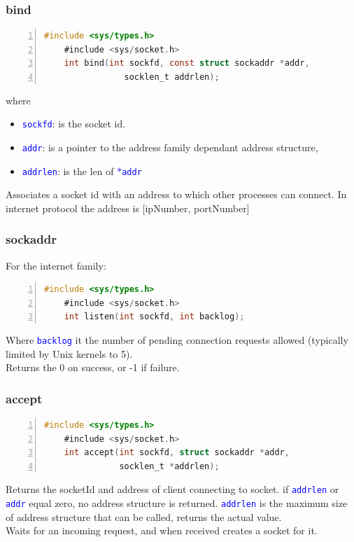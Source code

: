 \documentclass[12pt]{beamer}
\begin{document}
\begin{frame}[fragile]
	\frametitle{bind}
	{\tiny
	\begin{lstlisting}[language=C, breaklines=true, commentstyle=\color{mygreen},frame=lrtb,  rulecolor=\color{black}, numbers=left,  numbersep=5pt, numberstyle=\tiny\color{mygray}]
	#include <sys/types.h>
	#include <sys/socket.h>
	int bind(int sockfd, const struct sockaddr *addr,
                socklen_t addrlen);
	\end{lstlisting}}
	{\footnotesize
	where 
	\begin{itemize}
		\item \texttt{\textcolor{blue}{sockfd}}: is the socket id.
		\item \texttt{\textcolor{blue}{addr}}: is a pointer to the address family dependant address structure,
		\item \texttt{\textcolor{blue}{addrlen}}: is the len of \texttt{\textcolor{blue}{$\ast$addr}}
	\end{itemize}
	Associates a socket id with an address to which other processes can connect. In internet protocol the address is [ipNumber, portNumber]
	}
\end{frame}

\begin{frame}[fragile]
	\frametitle{sockaddr}
	{\footnotesize For the internet family:}
	{\tiny
	\begin{lstlisting}[language=C, breaklines=true, commentstyle=\color{mygreen},frame=lrtb,  rulecolor=\color{black}, numbers=left,  numbersep=5pt, numberstyle=\tiny\color{mygray}]
	#include <sys/types.h> 
	#include <sys/socket.h>
	int listen(int sockfd, int backlog);
	\end{lstlisting}}
	{\footnotesize
	Where \texttt{\textcolor{blue}{backlog}} it the number of pending connection requests allowed (typically limited by Unix kernels to 5). \\ Returns the 0 on success, or -1 if failure.
	}
\end{frame}

\begin{frame}[fragile]
	\frametitle{accept}
	{\tiny
	\begin{lstlisting}[language=C, breaklines=true, commentstyle=\color{mygreen},frame=lrtb,  rulecolor=\color{black}, numbers=left,  numbersep=5pt, numberstyle=\tiny\color{mygray}]
	#include <sys/types.h>
	#include <sys/socket.h>
	int accept(int sockfd, struct sockaddr *addr, 
	           socklen_t *addrlen);
	\end{lstlisting}}
	{\footnotesize
	Returns the socketId and address of client connecting to socket. if \texttt{\textcolor{blue}{addrlen}} or \texttt{\textcolor{blue}{addr}} equal zero, no address structure is returned. \texttt{\textcolor{blue}{addrlen}} is the maximum size of address structure that can be called, returns the actual value. \\Waits for an incoming request, and when received creates a socket for it.
	}
\end{frame}
\end{document}
